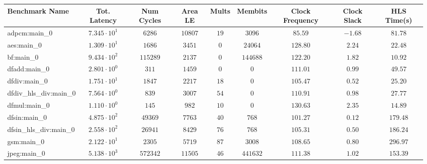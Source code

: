 \begin{tabular}{|l|c|c|c|c|c|c|c|c|}
\hline
Benchmark Name          & Tot. Latency           & Num Cycles & Area LE   & Mults   & Membits    & Clock Frequency & Clock Slack & HLS Time(s) \\
\hline
adpcm:main\_0           & $ 7.345 \cdot 10^{1} $ & $ 6286   $ & $ 10807 $ & $ 19  $ & $ 3096   $ & $ 85.59       $ & $ -1.68   $ & $ 81.78   $ \\
aes:main\_0             & $ 1.309 \cdot 10^{1} $ & $ 1686   $ & $ 3451  $ & $ 0   $ & $ 24064  $ & $ 128.80      $ & $ 2.24    $ & $ 22.48   $ \\
bf:main\_0              & $ 9.434 \cdot 10^{2} $ & $ 115289 $ & $ 2137  $ & $ 0   $ & $ 144688 $ & $ 122.20      $ & $ 1.82    $ & $ 10.92   $ \\
dfadd:main\_0           & $ 2.801 \cdot 10^{0} $ & $ 311    $ & $ 1459  $ & $ 0   $ & $ 0      $ & $ 111.01      $ & $ 0.99    $ & $ 49.57   $ \\
dfdiv:main\_0           & $ 1.751 \cdot 10^{1} $ & $ 1847   $ & $ 2217  $ & $ 18  $ & $ 0      $ & $ 105.47      $ & $ 0.52    $ & $ 25.20   $ \\
dfdiv\_hls\_div:main\_0 & $ 7.564 \cdot 10^{0} $ & $ 839    $ & $ 3007  $ & $ 54  $ & $ 0      $ & $ 110.91      $ & $ 0.98    $ & $ 27.77   $ \\
dfmul:main\_0           & $ 1.110 \cdot 10^{0} $ & $ 145    $ & $ 982   $ & $ 10  $ & $ 0      $ & $ 130.63      $ & $ 2.35    $ & $ 14.89   $ \\
dfsin:main\_0           & $ 4.875 \cdot 10^{2} $ & $ 49369  $ & $ 7763  $ & $ 40  $ & $ 768    $ & $ 101.27      $ & $ 0.12    $ & $ 179.48  $ \\
dfsin\_hls\_div:main\_0 & $ 2.558 \cdot 10^{2} $ & $ 26941  $ & $ 8429  $ & $ 76  $ & $ 768    $ & $ 105.31      $ & $ 0.50    $ & $ 186.24  $ \\
gsm:main\_0             & $ 2.122 \cdot 10^{1} $ & $ 2305   $ & $ 5719  $ & $ 87  $ & $ 3008   $ & $ 108.65      $ & $ 0.80    $ & $ 296.97  $ \\
jpeg:main\_0            & $ 5.138 \cdot 10^{3} $ & $ 572342 $ & $ 11505 $ & $ 46  $ & $ 441632 $ & $ 111.38      $ & $ 1.02    $ & $ 153.39  $ \\

\end{tabular}
